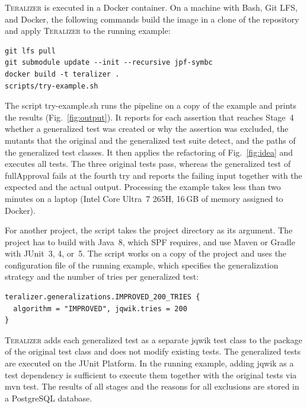 \documentclass[10pt,conference]{IEEEtran}
\newcommand{\Teralizer}{\textsc{Teralizer}}
\newcommand{\codefont}{\fontfamily{lmtt}\selectfont}
\newcommand{\code}[1]{{\codefont #1}}
\begin{document}
\Teralizer{} is executed in a Docker container.
On a machine with Bash, Git LFS, and Docker, the following commands build the image in a clone of the repository and apply \Teralizer{} to the running example:
\begin{lstlisting}[style=code]
git lfs pull
git submodule update --init --recursive jpf-symbc
docker build -t teralizer .
scripts/try-example.sh
\end{lstlisting}
\noindent The script \code{try-example.sh} runs the pipeline on a copy of the example and prints the results (Fig.~\ref{fig:output}).
It reports for each assertion that reaches Stage~4 whether a generalized test was created or why the assertion was excluded, the mutants that the original and the generalized test suite detect, and the paths of the generalized test classes.
It then applies the refactoring of Fig.~\ref{fig:idea} and executes all tests.
The three original tests pass, whereas the generalized test of \code{fullApproval} fails at the fourth try and reports the failing input together with the expected and the actual output.
Processing the example takes less than two minutes on a laptop (Intel Core Ultra~7 265H, 16\,GB of memory assigned to Docker).

For another project, the script takes the project directory as its argument.
The project has to build with Java~8, which SPF requires, and use Maven or Gradle with JUnit~3, 4, or~5.
The script works on a copy of the project and uses the configuration file of the running example, which specifies the generalization strategy and the number of tries per generalized test:
\begin{lstlisting}[style=code]
teralizer.generalizations.IMPROVED_200_TRIES {
  algorithm = "IMPROVED", jqwik.tries = 200
}
\end{lstlisting}

\Teralizer{} adds each generalized test as a separate jqwik test class to the package of the original test class and does not modify existing tests.
The generalized tests are executed on the JUnit Platform.
In the running example, adding jqwik as a test dependency is sufficient to execute them together with the original tests via \code{mvn test}.
The results of all stages and the reasons for all exclusions are stored in a PostgreSQL database.
\end{document}
